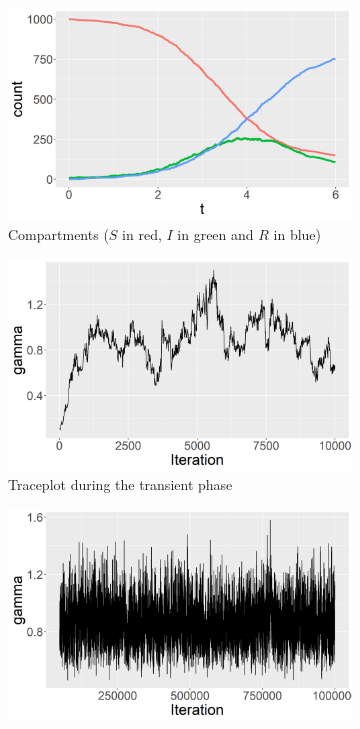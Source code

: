 \documentclass[12pt]{article}
\begin{document}
	\begin{figure}
		\begin{center}
			\begin{subfigure}[b]{0.32\textwidth}
				\centering
				\includegraphics[width=\textwidth]{E1_trajectories}
				\caption{Compartments ($S$ in red, $I$ in green and $R$ in blue)}
				\label{fig:E1_trajectories}
			\end{subfigure}
			\hfill
			\begin{subfigure}[b]{0.32\textwidth}
				\centering
				\includegraphics[width=\textwidth]{E1_short_no_burn_gamma_tp}
				\caption{Traceplot during the transient phase}
				\label{fig:E1_short_no_burn_gamma_tp}
			\end{subfigure}
			\hfill
			\begin{subfigure}[b]{0.32\textwidth}
				\centering
				\includegraphics[width=\textwidth]{E1_burn_gamma_tp}

\end{subfigure}
\end{center}
\end{figure}
\end{document}
